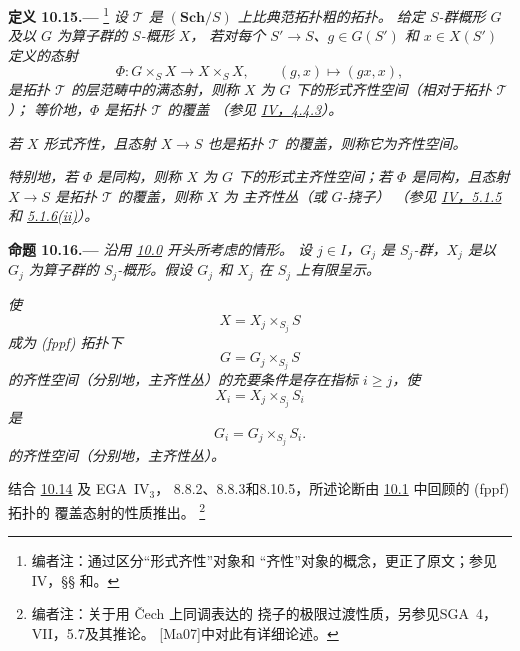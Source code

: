 \medskip
{}\label{def:sga3-VIB-10.15}%
\noindent\textbf{定义 10.15.---}%
\footnote{\label{note:sga3-VIB-102}编者注：通过区分“形式齐性”对象和
“齐性”对象的概念，更正了原文；参见IV，\S\S
{}和。}
\emph{设 \(\mathcal T\) 是 \((\mathbf{Sch}/S)\) 上比典范拓扑粗的拓扑。
给定 \(S\)-群概形 \(G\) 及以 \(G\) 为算子群的 \(S\)-概形 \(X\)，
若对每个 \(S'\to S\)、\(g\in G(S')\) 和 \(x\in X(S')\) 定义的态射}
\label{form:sga3-VIB-10.15-Phi}%
\[
  \Phi:G\times_S X\longrightarrow X\times_S X,
  \qquad
  (g,x)\longmapsto(gx,x),
\]
\emph{是拓扑 \(\mathcal T\) 的层范畴中的满态射，则称 \(X\) 为
\emph{\(G\) 下的形式齐性空间}\textup{（相对于拓扑 \(\mathcal T\)）}；
等价地，\(\Phi\) 是拓扑 \(\mathcal T\) 的覆盖
\textup{（参见 \hyperref[sga3:iv:proposition:4:4:3]{IV，4.4.3}）}。}

\emph{若 \(X\) 形式齐性，且态射 \(X\to S\) 也是拓扑
\(\mathcal T\) 的覆盖，则称它为\emph{齐性空间}。}

\emph{特别地，若 \(\Phi\) 是同构，则称 \(X\) 为
\emph{\(G\) 下的形式主齐性空间}；若 \(\Phi\) 是同构，且态射
\(X\to S\) 是拓扑 \(\mathcal T\) 的覆盖，则称 \(X\) 为
\emph{主齐性丛}\textup{（或 \(G\)-挠子）}
\textup{（参见 \hyperref[sga3:iv:definition:5:1:5]{IV，5.1.5}和
\hyperref[sga3:iv:proposition:5:1:6:item:ii:01]{5.1.6(ii)}）}。}

\medskip
{}\label{prop:sga3-VIB-10.16}%
\noindent\textbf{命题 10.16.---}
\emph{沿用 \hyperref[par:sga3-VIB-10.0]{10.0} 开头所考虑的情形。
设 \(j\in I\)，\(G_j\) 是 \(S_j\)-群，\(X_j\) 是以
\(G_j\) 为算子群的 \(S_j\)-概形。假设 \(G_j\) 和 \(X_j\)
在 \(S_j\) 上有限呈示。}

\emph{使}
\[
  X=X_j\times_{S_j}S
\]
\emph{成为 \textup{(fppf)} 拓扑下}
\[
  G=G_j\times_{S_j}S
\]
\emph{的齐性空间\textup{（分别地，主齐性丛）}的充要条件是存在指标
\(i\geq j\)，使}
\[
  X_i=X_j\times_{S_j}S_i
\]
\emph{是}
\[
  G_i=G_j\times_{S_j}S_i.
\]
\emph{的齐性空间\textup{（分别地，主齐性丛）}。}

结合 \hyperref[par:sga3-VIB-10.14]{10.14} 及 EGA~IV\(_3\)，
8.8.2、8.8.3和8.10.5，所述论断由
\hyperref[par:sga3-VIB-10.1]{10.1} 中回顾的 \textup{(fppf)} 拓扑的
覆盖态射的性质推出。%
\footnote{\label{note:sga3-VIB-103}编者注：关于用 \v{C}ech 上同调表达的
挠子的极限过渡性质，另参见SGA~4，VII，5.7及其推论。
\textup{[Ma07]}中对此有详细论述。}

